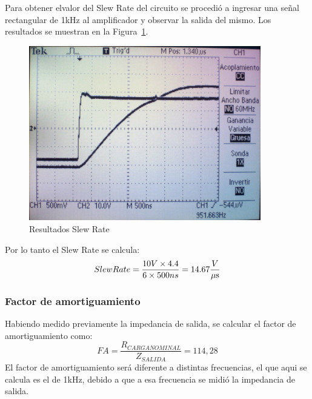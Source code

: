 Para obtener elvalor del Slew Rate del circuito se procedió a ingresar una señal rectangular de 1kHz al amplificador y observar la salida del mismo. Los resultados se muestran en la Figura~\ref{slew_rate_completo}.

\begin{figure}[H]
\centering
\includegraphics[width=0.9\textwidth]{img/slew_rate_completo.jpg}
\caption{Resultados Slew Rate}
\label{slew_rate_completo} 
\end{figure}


Por lo tanto el Slew Rate se calcula:
$$
Slew Rate =\frac{10V \times 4.4}{6 \times 500ns} = 14.67 \frac{V}{\mu\mbox{s}}
$$
\medskip
\subsubsection{Factor de amortiguamiento}

Habiendo medido previamente la impedancia de salida, se calcular el factor de amortiguamiento
como: 
$$
FA = \frac{R_{CARGA NOMINAL}}{Z_{SALIDA}} = 114,28
$$
El factor de amortiguamiento será diferente a distintas frecuencias, el que aqui se calcula es el de 1kHz, debido a que a esa frecuencia se midió la impedancia de salida.
